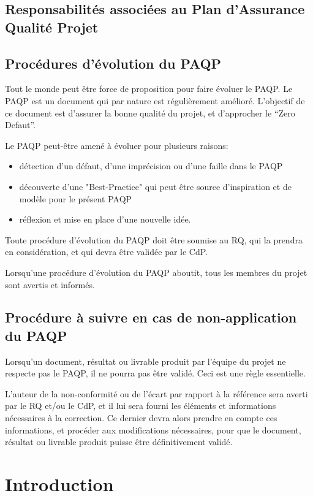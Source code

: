 \documentclass[a4paper]{article}
\begin{document}
\subsection{Responsabilités associées au Plan d'Assurance Qualité Projet}
\subsection{Procédures d'évolution du PAQP}

Tout le monde peut être force de proposition pour faire évoluer le PAQP. Le PAQP est un document qui par nature est régulièrement amélioré. L'objectif de ce document est d'assurer la bonne qualité du projet, et d'approcher le ``Zero Defaut''.

Le PAQP peut-être amené à évoluer pour plusieurs raisons:

\begin{itemize}
\item détection d'un défaut, d'une imprécision ou d'une faille dans le PAQP
\item découverte d'une "Best-Practice" qui peut être source d'inspiration et de modèle pour le présent PAQP
\item réflexion et mise en place d'une nouvelle idée.
\end{itemize}

Toute procédure d'évolution du PAQP doit être soumise au RQ, qui la prendra en considération, et qui devra être validée par le CdP.

Lorsqu'une procédure d'évolution du PAQP aboutit, tous les membres du projet sont avertis et informés.

\subsection{Procédure à suivre en cas de non-application du  PAQP}

Lorsqu'un document, résultat ou livrable produit par l'équipe du projet ne respecte pas le PAQP, il ne pourra pas être validé. Ceci est une règle essentielle.

L'auteur de la non-conformité ou de l'écart par rapport à la référence sera averti par le RQ et/ou le CdP, et il lui sera fourni les éléments et informations nécessaires à la correction. Ce dernier devra alors prendre en compte ces informations, et procéder aux modifications nécessaires, pour que le document, résultat ou livrable produit puisse être définitivement validé.

\section{Introduction}
\end{document}
